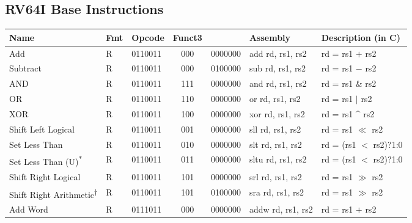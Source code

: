 \subsection*{RV64I Base Instructions}
    \newcommand{\funct}{\vtop{\hbox{\strut Funct7/}\hbox{\strut imm[11:5]}}}
    \newcommand{\qast}{\textsuperscript{*}}
    \newcommand{\qdag}{\textsuperscript{$\dagger$}}
    \begin{table}[h!]
        \scriptsize
        \begin{tabular}{|l|l|l|c|l|l|l|}
        	\hline
        	Name                                  & Fmt & Opcode  & Funct3 & \funct  & Assembly            & Description (in C)             \\
            \hline
        	Add                                   & R   & 0110011 &  000   & 0000000 & add rd, rs1, rs2    & rd = rs1 $+$ rs2               \\
        	Subtract                              & R   & 0110011 &  000   & 0100000 & sub rd, rs1, rs2    & rd = rs1 $-$ rs2               \\
        	AND                                   & R   & 0110011 &  111   & 0000000 & and rd, rs1, rs2    & rd = rs1 \& rs2                \\
        	OR                                    & R   & 0110011 &  110   & 0000000 & or rd, rs1, rs2     & rd = rs1 $|$ rs2               \\
        	XOR                                   & R   & 0110011 &  100   & 0000000 & xor rd, rs1, rs2    & rd = rs1 \^{} rs2              \\
        	Shift Left Logical                    & R   & 0110011 &  001   & 0000000 & sll rd, rs1, rs2    & rd = rs1 $\ll$ rs2             \\
        	Set Less Than                         & R   & 0110011 &  010   & 0000000 & slt rd, rs1, rs2    & rd = (rs1 $<$ rs2)?1:0         \\
        	Set Less Than (U)\qast                & R   & 0110011 &  011   & 0000000 & sltu rd, rs1, rs2   & rd = (rs1 $<$ rs2)?1:0         \\
        	Shift Right Logical                   & R   & 0110011 &  101   & 0000000 & srl rd, rs1, rs2    & rd = rs1 $\gg$ rs2             \\
        	Shift Right Arithmetic\qdag           & R   & 0110011 &  101   & 0100000 & sra rd, rs1, rs2    & rd = rs1 $\gg$ rs2             \\
            \hline
            Add Word                              & R   & 0111011 &  000   & 0000000 & addw rd, rs1, rs2   & rd = rs1 $+$ rs2               \\

\end{tabular}
\end{table}
